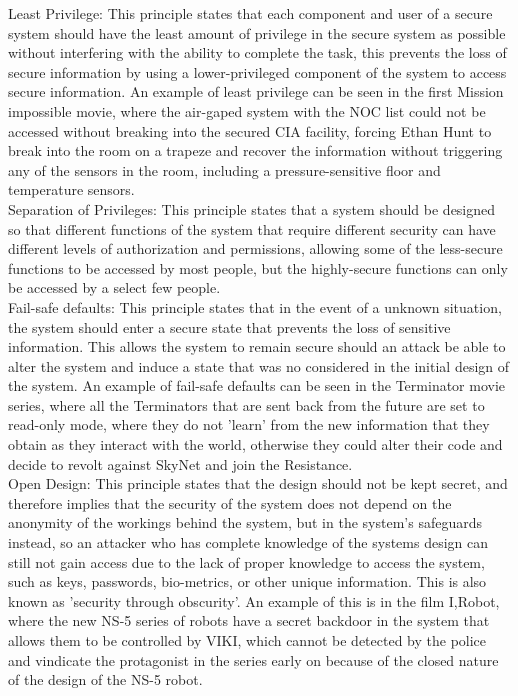 \documentclass[12pt,a4paper]{article}
\begin{document}
Least Privilege: This principle states that each component and user of a secure system should have the least amount of privilege in the secure system as possible without interfering with the ability to complete the task, this prevents the loss of secure information by using a lower-privileged component of the system to access secure information. An example of least privilege can be seen in the first Mission impossible movie, where the air-gaped system with the NOC list could not be accessed without breaking into the secured CIA facility, forcing Ethan Hunt to break into the room on a trapeze and recover the information without triggering any of the sensors in the room, including a pressure-sensitive floor and temperature sensors.\\

Separation of Privileges: This principle states that a system should be designed so that different functions of the system that require different security can have different levels of authorization and permissions, allowing some of the less-secure functions to be accessed by most people, but the highly-secure functions can only be accessed by a select few people.\\

Fail-safe defaults: This principle states that in the event of a unknown situation, the system should enter a secure state that prevents the loss of sensitive information. This allows the system to remain secure should an attack be able to alter the system and induce a state that was no considered in the initial design of the system. An example of fail-safe defaults can be seen in the Terminator movie series, where all the Terminators that are sent back from the future are set to read-only mode, where they do not 'learn' from the new information that they obtain as they interact with the world, otherwise they could alter their code and decide to revolt against SkyNet and join the Resistance.\\

Open Design: This principle states that the design should not be kept secret, and therefore implies that the security of the system does not depend on the anonymity of the workings behind the system, but in the system's safeguards instead, so an attacker who has complete knowledge of the systems design can still not gain access due to the lack of proper knowledge to access the system, such as keys, passwords, bio-metrics, or other unique information. This is also known as 'security through obscurity'. An example of this is in the film I,Robot, where the new NS-5 series of robots have a secret backdoor in the system that allows them to be controlled by VIKI, which cannot be detected by the police and vindicate the protagonist in the series early on because of the closed nature of the design of the NS-5 robot.
\end{document}

